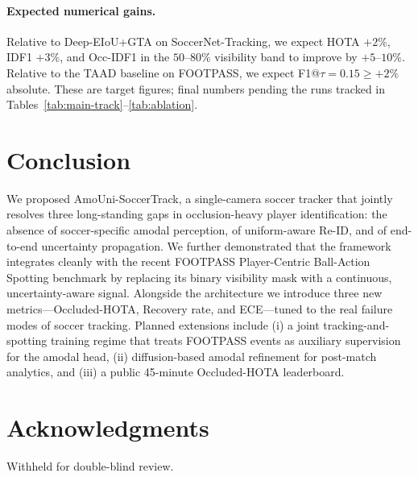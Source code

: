 \documentclass[conference]{IEEEtran}
\begin{document}
\paragraph*{Expected numerical gains.}
Relative to Deep-EIoU+GTA \cite{deepeiou,gtatrack} on SoccerNet-Tracking, we expect HOTA $+2\%$, IDF1 $+3\%$, and Occ-IDF1 in the $50$--$80\%$ visibility band to improve by $+5$--$10\%$. Relative to the TAAD baseline \cite{footpass} on FOOTPASS, we expect F1@$\tau=0.15 \geq +2\%$ absolute. These are target figures; final numbers pending the runs tracked in Tables~\ref{tab:main-track}--\ref{tab:ablation}.

\section{Conclusion}
\label{sec:conclusion}

We proposed AmoUni-SoccerTrack, a single-camera soccer tracker that jointly resolves three long-standing gaps in occlusion-heavy player identification: the absence of soccer-specific amodal perception, of uniform-aware Re-ID, and of end-to-end uncertainty propagation. We further demonstrated that the framework integrates cleanly with the recent FOOTPASS Player-Centric Ball-Action Spotting benchmark by replacing its binary visibility mask with a continuous, uncertainty-aware signal. Alongside the architecture we introduce three new metrics---Occluded-HOTA, Recovery rate, and ECE---tuned to the real failure modes of soccer tracking. Planned extensions include (i) a joint tracking-and-spotting training regime that treats FOOTPASS events as auxiliary supervision for the amodal head, (ii) diffusion-based amodal refinement for post-match analytics, and (iii) a public 45-minute Occluded-HOTA leaderboard.

\section*{Acknowledgments}
Withheld for double-blind review.



\end{document}
